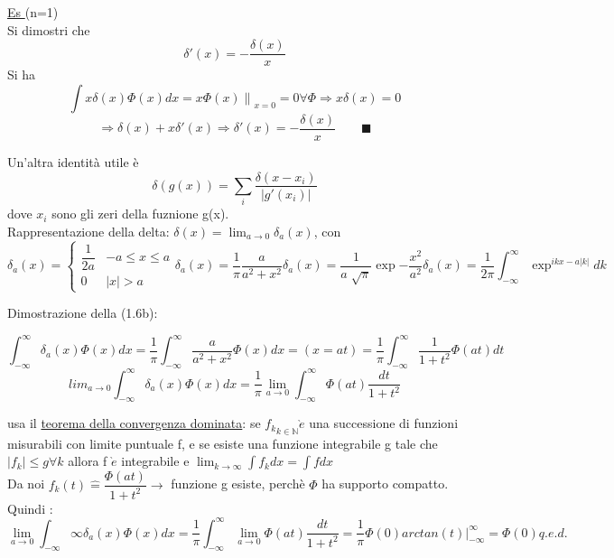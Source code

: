 \documentclass[a4paper,11pt]{report}
\begin{document}
\underline{Es } (n=1)\\
Si dimostri che 
\begin{equation}
\delta' (x) =-\dfrac{\delta(x)}{x}
\end{equation}
Si ha $$\int x\delta(x)\Phi(x)dx = \left.x\Phi(x)\right\|_{x=0}=0 \forall \Phi \Rightarrow x\delta(x)=0 $$
$$\Rightarrow \delta(x) + x\delta ' (x) \Rightarrow \delta ' (x) = -\dfrac{\delta(x)}{x}  \qquad \blacksquare$$

Un'altra identità utile è
\begin{equation}
\delta(g(x)) = \sum_{i}\dfrac{\delta(x-x_i)}{|g'(x_i)|} 
\end{equation} 
dove $x_i$ sono gli zeri della fuznione g(x).\\
Rappresentazione della delta: $\delta(x) = \lim_{a\to 0} \delta_a(x)$, con 
\begin{subequations}
\begin{equation}
\delta_a(x)=\left\{\begin{matrix}
\dfrac{1}{2a} & -a \leq x \leq a \\
0 & |x| > a
\end{matrix}\right.
\end{equation}
\begin{equation}
\delta_a(x) = \dfrac{1}{\pi}\dfrac{a}{a^2+x^2}
\end{equation}
\begin{equation}
\delta_a(x) = \dfrac{1}{a\sqrt[]{\pi}}\exp{-\dfrac{x^2}{a^2}}
\end{equation}
\begin{equation}
\delta_a(x) = \dfrac{1}{2\pi} \int_{-\infty}^{\infty}\exp^{ikx-a|k|}dk
\end{equation}
\end{subequations}

Dimostrazione della (1.6b):

$$\int_{-\infty}^{\infty} \delta_a(x)\Phi(x)dx=
\dfrac{1}{\pi}\int_{-\infty}^{\infty}\dfrac{a}{a^2+x^2}\Phi(x)dx = (x=at) = 
\dfrac{1}{\pi}\int_{-\infty}^{\infty}\dfrac{1}{1+t^2}\Phi(at)dt$$
$$lim_{a\to 0} \int_{-\infty}^{\infty}\delta_a(x)\Phi(x)dx=\dfrac{1}{\pi}\lim_{a\to 0}\int_{-\infty}^{\infty}\Phi(at)\dfrac{dt}{1+t^2}$$

usa il \underline{teorema della convergenza dominata}:
se ${f_k}_{k\in\mathbb{N}} \grave{e}$ una successione di funzioni misurabili con limite puntuale f, e se esiste una funzione integrabile g tale che $|f_k|\leq g \forall k$ allora f $\grave{e}$ integrabile e $\lim_{k\to \infty}\int f_k dx = \int f dx$\\
Da noi $f_k(t)\hat{=}\dfrac{\Phi(at)}{1+t^2}\rightarrow$ funzione g esiste, perchè $\Phi$ ha supporto compatto.\\
Quindi : $$
\lim_{a\to 0}\int_{-\infty}{\infty}\delta_a(x)\Phi(x)dx=\dfrac{1}{\pi}\int_{-\infty}^{\infty} \lim_{a\to 0} \Phi(at) \dfrac{dt}{1+t^2}=\dfrac{1}{\pi} \Phi(0) arctan(t)|_{-\infty}^{\infty}=\Phi(0) q.e.d.$$
\end{document}

